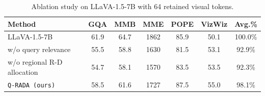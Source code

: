\begin{table}[t]
  \centering
  \scriptsize
  \setlength{\tabcolsep}{4.5pt}
  \caption{Ablation study on LLaVA-1.5-7B with 64 retained visual tokens.}
  \label{tab:ablation}
  \begin{tabular}{l|ccccc|c}
  \toprule
  Method & GQA & MMB & MME & POPE & VizWiz & Avg.\% \\
  \midrule
  LLaVA-1.5-7B
  & 61.9 & 64.7 & 1862 & 85.9 & 50.1 & 100.0\% \\

  w/o query relevance
  & 55.5 & 58.8 & 1630 & 81.5 & 53.1 & 92.9\% \\

  w/o regional R-D allocation
  & 54.7 & 58.1 & 1570 & 83.5 & 53.5 & 92.3\% \\

  \rowcolor{gray!20}\texttt{Q-RADA (ours)}
  & 58.5 & 61.6 & 1727
  & 87.5 & 55.0 & 98.1\% \\
  \bottomrule
  \end{tabular}
  \end{table}
